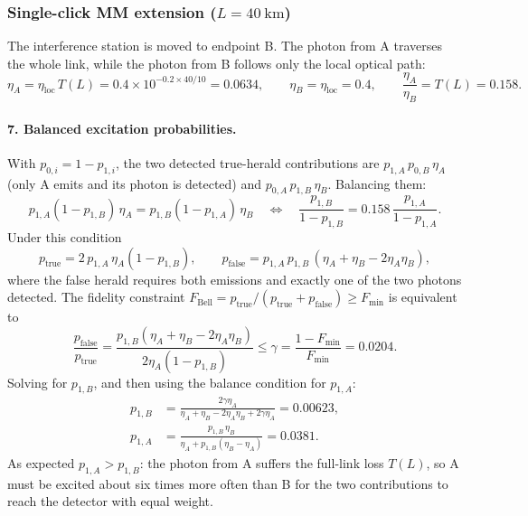 \subsubsection*{Single-click MM extension ($L = \SI{40}{\kilo\metre}$)}
The interference station is moved to endpoint B. The photon from A traverses the whole link, while
the photon from B follows only the local optical path:
\begin{equation}
  \eta_A = \eta_\mathrm{loc}\,T(L) = 0.4\times10^{-0.2\times40/10} = 0.0634,
  \qquad
  \eta_B = \eta_\mathrm{loc} = 0.4,
  \qquad
  \frac{\eta_A}{\eta_B} = T(L) = 0.158 .
\end{equation}

\paragraph{7. Balanced excitation probabilities.}
With $p_{0,i} = 1-p_{1,i}$, the two detected true-herald contributions are
$p_{1,A}\,p_{0,B}\,\eta_A$ (only A emits and its photon is detected) and $p_{0,A}\,p_{1,B}\,\eta_B$.
Balancing them:
\begin{equation}
  p_{1,A}(1-p_{1,B})\,\eta_A = p_{1,B}(1-p_{1,A})\,\eta_B
  \quad\Leftrightarrow\quad
  \frac{p_{1,B}}{1-p_{1,B}} = 0.158\,\frac{p_{1,A}}{1-p_{1,A}} .
\end{equation}
Under this condition
\begin{equation}
  p_\mathrm{true} = 2\,p_{1,A}\,\eta_A(1-p_{1,B}),
  \qquad
  p_\mathrm{false} = p_{1,A}\,p_{1,B}\,(\eta_A+\eta_B-2\eta_A\eta_B),
\end{equation}
where the false herald requires both emissions and exactly one of the two photons detected.
The fidelity constraint $F_\mathrm{Bell} = p_\mathrm{true}/(p_\mathrm{true}+p_\mathrm{false}) \ge F_\mathrm{min}$
is equivalent to
\begin{equation}
  \frac{p_\mathrm{false}}{p_\mathrm{true}}
  = \frac{p_{1,B}(\eta_A+\eta_B-2\eta_A\eta_B)}{2\eta_A(1-p_{1,B})}
  \le \gamma = \frac{1-F_\mathrm{min}}{F_\mathrm{min}} = 0.0204 .
\end{equation}
Solving for $p_{1,B}$, and then using the balance condition for $p_{1,A}$:
\begin{align}
  p_{1,B} &= \frac{2\gamma\eta_A}{\eta_A+\eta_B-2\eta_A\eta_B+2\gamma\eta_A} = 0.00623,\\
  p_{1,A} &= \frac{p_{1,B}\,\eta_B}{\eta_A + p_{1,B}(\eta_B-\eta_A)} = 0.0381 .
\end{align}
As expected $p_{1,A} > p_{1,B}$: the photon from A suffers the full-link loss $T(L)$, so A
must be excited about six times more often than B for the two contributions to reach the detector with
equal weight.

